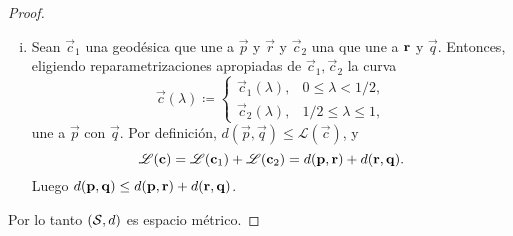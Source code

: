 \begin{proof}
\begin{enumerate}[(i)]
		\item Sean $\vec c_1$ una geodésica que une a $\vec p$ y $\vec r$ y $\vec c_2$ una que une a $\mathbf r$ y $\vec q$. Entonces, eligiendo reparametrizaciones apropiadas de $\vec c_1, \vec c_2$ la curva
		\begin{equation}
			\vec c(\lambda) \coloneqq \begin{cases}
				\vec c_1(\lambda), & 0 \le \lambda < 1/2,\\
				\vec c_2(\lambda), & 1/2 \le \lambda \le 1,
			\end{cases}
		\end{equation}
		une a $\vec p$ con $\vec q$.
			Por definición, $d(\vec p, \vec q) \le \mathscr L(\vec c)$, y
	\begin{equation}
		\mathscr L(\mathbf c) = \mathscr L(\mathbf c_1) + \mathscr L(\mathbf c_2) = d(\mathbf p, \mathbf r) + d(\mathbf r, \mathbf q).
	\end{equation}
	Luego $d(\mathbf p, \mathbf q) \le d(\mathbf p, \mathbf r) + d(\mathbf r, \mathbf q)$.
	\end{enumerate}
	
	Por lo tanto $(\mathcal S, d)$ es espacio métrico.
\end{proof}